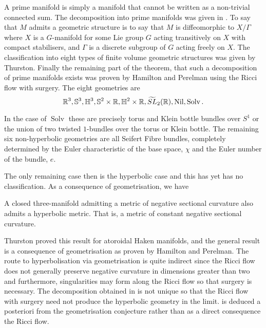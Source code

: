 \documentclass[a4paper,12pt]{amsart}
\begin{document}
A prime manifold is simply a manifold that cannot be written as a non-trivial connected sum. The decomposition into prime manifolds was given in \cite{MR0142125}. To say that \(M\) admits a geometric structure is to say that \(M\) is diffeomorphic to \(X/\Gamma\) where \(X\) is a \(G\)-manifold for some Lie group \(G\) acting transitively on \(X\) with compact stabilisers, and \(\Gamma\) is a discrete subgroup of \(G\) acting freely on \(X\). The classification into eight types of finite volume geometric structures was given by Thurston. Finally the remaining part of the theorem, that such a decomposition of prime manifolds exists was proven by Hamilton and Perelman using the Ricci flow with surgery. The eight geometries are
\[
\mathbb{R}^3, \mathbb{S}^3, \mathbb{H}^3, \mathbb{S}^2 \times \mathbb{R}, \mathbb{H}^2 \times \mathbb{R}, \widetilde{SL}_2(\mathbb{R}), \operatorname{Nil}, \operatorname{Solv}.
\]

In the case of \(\operatorname{Solv}\) these are precisely torus and Klein bottle bundles over \(S^1\) or the union of two twisted \(1\)-bundles over the torus or Klein bottle. The remaining six non-hyperbolic geometries are all Seifert Fibre bundles, completely determined by the Euler characteristic of the base space, \(\chi\) and the Euler number of the bundle, \(e\).

The only remaining case then is the hyperbolic case and this has yet has no classification. As a consequence of geometrisation, we have

\begin{thm}[Hyperbolisation]
\label{thm:hyperbolisation}

A closed three-manifold admitting a metric of negative sectional curvature also admits a hyperbolic metric. That is, a metric of constant negative sectional curvature.
\end{thm}

Thurston proved this result for atoroidal Haken manifolds, and the general result is a consequence of geometrisation as proven by Hamilton and Perelman. The route to hyperbolisation via geometrisation is quite indirect since the Ricci flow does not generally preserve negative curvature in dimensions greater than two and furthermore, singularities may form along the Ricci flow so that surgery is necessary. The decomposition obtained in  is not unique so that the Ricci flow with surgery need not produce the hyperbolic geometry in the limit.  is deduced a posteriori from the geometrisation conjecture rather than as a direct consequence the Ricci flow.
\end{document}
